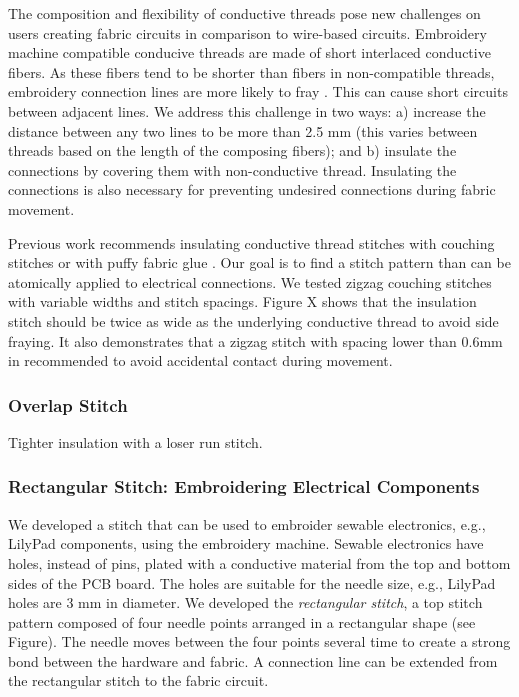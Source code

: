 The composition and flexibility of conductive threads pose new challenges on users creating fabric circuits in comparison to wire-based circuits. Embroidery machine compatible conducive threads are made of short interlaced conductive fibers. As these fibers tend to be shorter than fibers in non-compatible threads, embroidery connection lines are more likely to fray \cite{5387040}. This can cause short circuits between adjacent lines. We address this challenge in two ways: a) increase the distance between any two lines to be more than 2.5 mm (this varies between threads based on the length of the composing fibers); and b) insulate the connections by covering them with non-conductive thread. Insulating the connections is also necessary for preventing undesired connections during fabric movement.

Previous work recommends insulating conductive
thread stitches with couching stitches or with puffy
fabric glue \cite{Buechley2009}. Our goal is to find a stitch pattern than can be atomically applied to electrical connections. We tested zigzag couching stitches with variable widths and stitch spacings. Figure X shows that the insulation stitch should be twice as wide as the underlying conductive thread to avoid side fraying. It also demonstrates that a zigzag stitch with spacing lower than 0.6mm in recommended to avoid accidental contact during movement.

\subsubsection{Overlap Stitch}
Tighter insulation with a loser run stitch.

\subsubsection{Rectangular Stitch: Embroidering Electrical Components}
We developed a stitch that can be used to embroider sewable electronics, e.g., LilyPad components, using the embroidery machine. Sewable electronics have holes, instead of pins, plated with a conductive material from the top and bottom sides of the PCB board. The holes are suitable for the needle size, e.g., LilyPad holes are 3 mm in diameter. We developed the \textit{rectangular stitch}, a top stitch pattern composed of four needle points arranged in a rectangular shape (see Figure). The needle moves between the four points several time to create a strong bond between the hardware and fabric. A connection line can be extended from the rectangular stitch to the fabric circuit.

